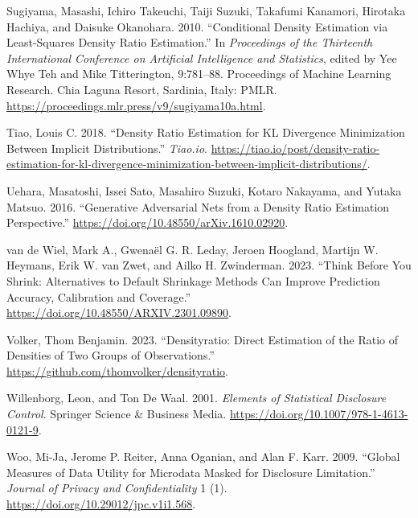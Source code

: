 \documentclass[
]{article}
\newlength{\cslhangindent}
\newlength{\cslentryspacingunit} %
\newenvironment{CSLReferences}[2] %
 {%
  \setlength{\parindent}{0pt}
  \ifodd #1
  \let\oldpar\par
  \def\par{\hangindent=\cslhangindent\oldpar}
  \fi
  \setlength{\parskip}{#2\cslentryspacingunit}
 }%
 {}
\begin{document}
\begin{CSLReferences}{1}{0}
\leavevmode{}%
Sugiyama, Masashi, Ichiro Takeuchi, Taiji Suzuki, Takafumi Kanamori,
Hirotaka Hachiya, and Daisuke Okanohara. 2010. {``Conditional Density
Estimation via Least-Squares Density Ratio Estimation.''} In
\emph{Proceedings of the Thirteenth International Conference on
Artificial Intelligence and Statistics}, edited by Yee Whye Teh and Mike
Titterington, 9:781--88. Proceedings of Machine Learning Research. Chia
Laguna Resort, Sardinia, Italy: PMLR.
\url{https://proceedings.mlr.press/v9/sugiyama10a.html}.

\leavevmode{}%
Tiao, Louis C. 2018. {``{D}ensity {R}atio {E}stimation for {KL}
{D}ivergence {M}inimization Between {I}mplicit {D}istributions.''}
\emph{Tiao.io}.
\url{https://tiao.io/post/density-ratio-estimation-for-kl-divergence-minimization-between-implicit-distributions/}.

\leavevmode{}%
Uehara, Masatoshi, Issei Sato, Masahiro Suzuki, Kotaro Nakayama, and
Yutaka Matsuo. 2016. {``Generative Adversarial Nets from a Density Ratio
Estimation Perspective.''}
\url{https://doi.org/10.48550/arXiv.1610.02920}.

\leavevmode{}%
van de Wiel, Mark A., Gwenaël G. R. Leday, Jeroen Hoogland, Martijn W.
Heymans, Erik W. van Zwet, and Ailko H. Zwinderman. 2023. {``Think
Before You Shrink: Alternatives to Default Shrinkage Methods Can Improve
Prediction Accuracy, Calibration and Coverage.''}
\url{https://doi.org/10.48550/ARXIV.2301.09890}.

\leavevmode{}%
Volker, Thom Benjamin. 2023. {``Densityratio: Direct Estimation of the
Ratio of Densities of Two Groups of Observations.''}
\url{https://github.com/thomvolker/densityratio}.

\leavevmode{}%
Willenborg, Leon, and Ton De Waal. 2001. \emph{Elements of Statistical
Disclosure Control}. Springer Science \& Business Media.
\url{https://doi.org/10.1007/978-1-4613-0121-9}.

\leavevmode{}%
Woo, Mi-Ja, Jerome P. Reiter, Anna Oganian, and Alan F. Karr. 2009.
{``Global Measures of Data Utility for Microdata Masked for Disclosure
Limitation.''} \emph{Journal of Privacy and Confidentiality} 1 (1).
\url{https://doi.org/10.29012/jpc.v1i1.568}.


\end{CSLReferences}
\end{document}
